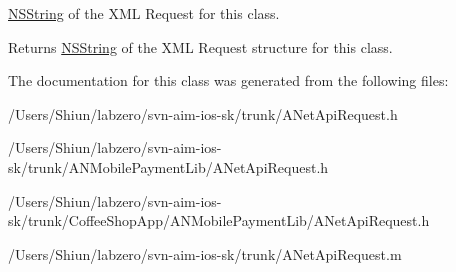\hyperlink{class_n_s_string}{NSString} of the XML Request for this class. 

\begin{DoxyReturn}{Returns}
\hyperlink{class_n_s_string}{NSString} of the XML Request structure for this class. 
\end{DoxyReturn}


The documentation for this class was generated from the following files:\begin{DoxyCompactItemize}
\item 
/Users/Shiun/labzero/svn-\/aim-\/ios-\/sk/trunk/ANetApiRequest.h\item 
/Users/Shiun/labzero/svn-\/aim-\/ios-\/sk/trunk/ANMobilePaymentLib/ANetApiRequest.h\item 
/Users/Shiun/labzero/svn-\/aim-\/ios-\/sk/trunk/CoffeeShopApp/ANMobilePaymentLib/ANetApiRequest.h\item 
/Users/Shiun/labzero/svn-\/aim-\/ios-\/sk/trunk/ANetApiRequest.m\end{DoxyCompactItemize}
